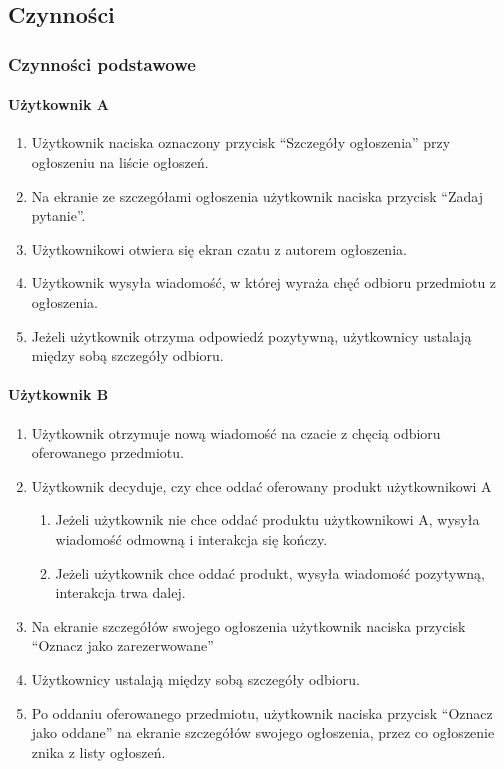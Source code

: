 \documentclass[12pt,a4paper,twoside]{article}
\begin{document}
    \subsection{Czynności}
    
    \subsubsection{Czynności podstawowe}
    
    \paragraph{Użytkownik A}
    
    \begin{enumerate}
        \item Użytkownik naciska oznaczony przycisk ``Szczegóły ogłoszenia'' przy ogłoszeniu na liście ogłoszeń.
        \item Na ekranie ze szczegółami ogłoszenia użytkownik naciska przycisk ``Zadaj pytanie''.
        \item Użytkownikowi otwiera się ekran czatu z autorem ogłoszenia.
        \item Użytkownik wysyła wiadomość, w której wyraża chęć odbioru przedmiotu z ogłoszenia.
        \item Jeżeli użytkownik otrzyma odpowiedź pozytywną, użytkownicy ustalają między sobą szczegóły odbioru.
    \end{enumerate}

    \paragraph{Użytkownik B}
    
    \begin{enumerate}
        \item Użytkownik otrzymuje nową wiadomość na czacie z chęcią odbioru oferowanego przedmiotu.
        \item Użytkownik decyduje, czy chce oddać oferowany produkt użytkownikowi A
        \begin{enumerate}
            \item Jeżeli użytkownik nie chce oddać produktu użytkownikowi A, wysyła wiadomość odmowną i interakcja się kończy.
            \item Jeżeli użytkownik chce oddać produkt, wysyła wiadomość pozytywną, interakcja trwa dalej.
        \end{enumerate}
        \item Na ekranie szczegółów swojego ogłoszenia użytkownik naciska przycisk ``Oznacz jako zarezerwowane''
        \item Użytkownicy ustalają między sobą szczegóły odbioru.
        \item Po oddaniu oferowanego przedmiotu, użytkownik naciska przycisk ``Oznacz jako oddane'' na ekranie szczegółów swojego ogłoszenia, przez co ogłoszenie znika z listy ogłoszeń.
    \end{enumerate}
    
\end{document}
